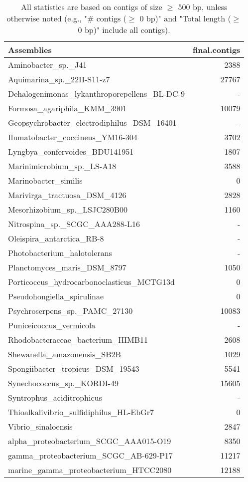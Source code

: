 \documentclass[12pt,a4paper]{article}
\begin{document}
\begin{table}[ht]
\begin{center}
\caption{All statistics are based on contigs of size $\geq$ 500 bp, unless otherwise noted (e.g., "\# contigs ($\geq$ 0 bp)" and "Total length ($\geq$ 0 bp)" include all contigs).}
\begin{tabular}{|l*{1}{|r}|}
\hline
Assemblies & final.contigs \\ \hline
Aminobacter\_sp.\_J41 & 2388 \\ \hline
Aquimarina\_sp.\_22II-S11-z7 & 27767 \\ \hline
Dehalogenimonas\_lykanthroporepellens\_BL-DC-9 & - \\ \hline
Formosa\_agariphila\_KMM\_3901 & 10079 \\ \hline
Geopsychrobacter\_electrodiphilus\_DSM\_16401 & - \\ \hline
Ilumatobacter\_coccineus\_YM16-304 & 3702 \\ \hline
Lyngbya\_confervoides\_BDU141951 & 1807 \\ \hline
Marinimicrobium\_sp.\_LS-A18 & 3588 \\ \hline
Marinobacter\_similis & 0 \\ \hline
Marivirga\_tractuosa\_DSM\_4126 & 2828 \\ \hline
Mesorhizobium\_sp.\_LSJC280B00 & 1160 \\ \hline
Nitrospina\_sp.\_SCGC\_AAA288-L16 & - \\ \hline
Oleispira\_antarctica\_RB-8 & - \\ \hline
Photobacterium\_halotolerans & - \\ \hline
Planctomyces\_maris\_DSM\_8797 & 1050 \\ \hline
Porticoccus\_hydrocarbonoclasticus\_MCTG13d & 0 \\ \hline
Pseudohongiella\_spirulinae & 0 \\ \hline
Psychroserpens\_sp.\_PAMC\_27130 & 10083 \\ \hline
Puniceicoccus\_vermicola & - \\ \hline
Rhodobacteraceae\_bacterium\_HIMB11 & 2608 \\ \hline
Shewanella\_amazonensis\_SB2B & 1029 \\ \hline
Spongiibacter\_tropicus\_DSM\_19543 & 5541 \\ \hline
Synechococcus\_sp.\_KORDI-49 & 15605 \\ \hline
Syntrophus\_aciditrophicus & - \\ \hline
Thioalkalivibrio\_sulfidiphilus\_HL-EbGr7 & 0 \\ \hline
Vibrio\_sinaloensis & 2847 \\ \hline
alpha\_proteobacterium\_SCGC\_AAA015-O19 & 8350 \\ \hline
gamma\_proteobacterium\_SCGC\_AB-629-P17 & 11217 \\ \hline
marine\_gamma\_proteobacterium\_HTCC2080 & 12188 \\ \hline
\end{tabular}
\end{center}
\end{table}
\end{document}
